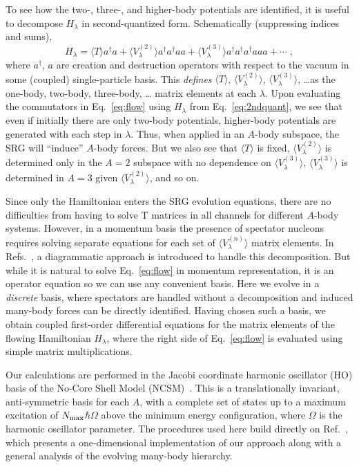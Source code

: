 \documentclass[prc,twocolumn,showpacs,floatfix,nofootinbib,superscriptaddress]{revtex4}
\newcommand{\beqn}{\begin{equation}}
\newcommand{\eeqn}{\end{equation}}
\newcommand{\la}{\langle}
\newcommand{\ra}{\rangle}
\newcommand{\nmax}{$N_{\rm max}$}
\newcommand{\adag}{a^\dagger}
\begin{document}
To see how the two-, three-, and higher-body potentials
are identified, it is useful to decompose $H_\lambda$ in second-quantized
form.  Schematically (suppressing indices and sums),
\beqn
  H_\lambda = \la T \ra \adag a  + \la V_\lambda^{(2)} \ra \adag\adag a a
       + \la V_\lambda^{(3)} \ra \adag\adag\adag a a a + \cdots
       \;,
       \label{eq:2ndquant}
\eeqn
where $\adag$, $a$ are creation and destruction operators
with respect to the vacuum in some (coupled) single-particle basis. 
This \emph{defines} $\la T \ra$, $\la V_\lambda^{(2)} \ra$,
$\la V_\lambda^{(3)} \ra$, \ldots as the one-body,
two-body, three-body, \ldots
matrix elements at each $\lambda$. 
Upon evaluating
the commutators in Eq.~\eqref{eq:flow} using $H_\lambda$ from
Eq.~\eqref{eq:2ndquant}, we see that even if initially there are only
two-body potentials, higher-body potentials are generated with
each step in $\lambda$. 
Thus, when applied in an $A$-body subspace, the SRG will ``induce''
$A$-body forces. 
But we also see that $\la T \ra$ is
fixed, $\la V_\lambda^{(2)} \ra$ is determined only in the $A=2$
subspace with no dependence on $\la V_\lambda^{(3)} \ra$, $\la V_\lambda^{(3)} \ra$ is determined  in $A=3$ given $\la
V_\lambda^{(2)} \ra$, and so on.

Since only the Hamiltonian enters
the SRG evolution equations, there are no difficulties from having
to solve T matrices in all channels for different $A$-body
systems.
However, in a momentum basis the presence of spectator nucleons
requires solving separate equations for each set
of $\la V^{(n)}_\lambda \ra$ matrix elements.
In Refs.~\cite{Bogner:2007qb,Jurgenson:2008jp}, a diagrammatic
approach is introduced to handle this decomposition.
But while it is natural to solve Eq.~\eqref{eq:flow} in momentum
representation, it is an operator equation so we can use any
convenient basis. 
Here we evolve in a \emph{discrete} basis, where spectators
are handled without a decomposition and induced many-body forces
can be directly identified.  
Having chosen such a basis, we obtain coupled
first-order differential equations for the matrix elements of the
flowing Hamiltonian $H_\lambda$, where the right side
of Eq.~\eqref{eq:flow} is evaluated
using simple matrix multiplications.

Our calculations  are performed in the Jacobi coordinate
harmonic oscillator (HO) basis of the No-Core Shell Model
(NCSM)~\cite{Navratil:2009ut}. This is a translationally
invariant, anti-symmetric basis for each $A$, with a complete set
of states up to a maximum excitation of \nmax$\hbar\Omega$ above
the minimum energy configuration, where $\Omega$ is the harmonic
oscillator parameter. The procedures used here build directly on
Ref.~\cite{Jurgenson:2008jp}, which presents a one-dimensional
implementation of our approach along with a general analysis
of the evolving many-body hierarchy.
\end{document}
